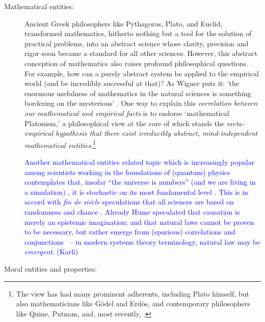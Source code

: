 \documentclass[a4paper,12pt]{article}
\newcommand{\karli}[1]{\textcolor{blue}{#1 (Karli)}}
\begin{document}
\begin{description}

\item[Mathematical entities:]

Ancient Greek philosophers like Pythagoras, Plato, and Euclid, transformed mathematics,
hitherto nothing but a tool for the solution of practical problems,
into an abstract science whose clarity, precision and rigor soon became a standard for all other sciences.
However, this abstract conception of mathematics also raises profound philosophical questions.
For example, how can a purely abstract system be applied to the empirical world (and be incredibly successful at that)? As Wigner puts it: `the enormous usefulness of mathematics in the natural sciences is something bordering on the mysterious' \cite[p.~2]{Wigner1960}. One way to explain this \textit{correlation between our mathematical and empirical facts} is to endorse `mathematical Platonism,' a philosophical view at the core of which stands the \textit{meta-empirical hypothesis that there exist irreducibly abstract, mind-independent mathematical entities}.\footnote{The view has had many prominent adherents, including Plato himself, but also mathematicians like Gödel and Erdös, and contemporary philosophers like Quine, Putnam, and, most recently, \cite{Colyvan2001}.}

\karli{
Another mathematical entities related topic
which is increasingly popular among scientists working in the foundations of (quantum) physics
contemplates that, insofar ``the universe is numbers'' (and we are living in a simulation)
\cite{schroed:natgr,mg1968,zuse-69,zuse-70,fredkin,toffoli:79,margolus-billard,svozil-93,wolfram-2002,svozil-2005-cu,tegmark2007,calude2013theeinai,tegmark2014,Bostrom-sim},
it is stochastic on its most fundamental level
\cite{armstrong_1983,vanFraassen1989-VANLAS,calude-meyerstein,lawlses_rosen2010,calude2013theeinai,chaos_multiverse2017,Mueller-2017,Cabello-2018-BornRule,svozil-2018-was}.
This is in accord with {\it fin de si\'ecle} speculations \cite{Hiebert2000,Stoeltzner1999}
that all sciences are based on randomness and chance \cite{Exner-1908,schrodinger-1929,book:16081,born-26-1}.
Already Hume speculated that causation is merely an epistemic imagination; and that natural laws cannot be proven to be necessary, but rather emerge
from (spurious) correlations and conjunctions~\cite{Hume-Treatise} -- in modern systems theory terminology, natural law may be {\em emergent}.
}

\item[Moral entities and properties:]


\end{description}
\end{document}

